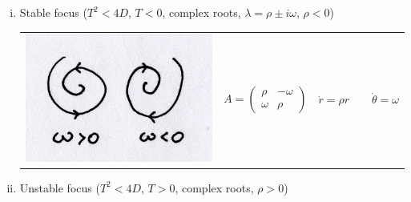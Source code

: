 \documentclass{article}
\begin{document}
\begin{enumerate}[(i)]
\item Stable focus ($ T^2 < 4D $, $T<0$, complex roots, 
$\lambda = \rho \pm i \omega$, $\rho < 0$)
\\
\begin{tabular}{ m{5.5cm} m{3cm} m{3cm} } 
\includegraphics[scale = 0.18]{fig8.png}  & 
$  A = \left( \begin{array}{cc}
		\rho & -\omega \\
		 \omega & \rho \end{array} \right) $
 & $ \dot{r} = \rho r \qquad \dot{\theta} = \omega $
\end{tabular}

\item Unstable focus ($ T^2 < 4D $, $T>0$, complex roots, $\rho > 0$)


\end{enumerate}
\end{document}
